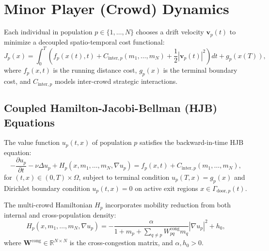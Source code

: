 \documentclass[11pt,a4paper]{article}
\begin{document}
\section{Minor Player (Crowd) Dynamics}

Each individual in population $p \in \{1, \dots, N\}$ chooses a drift velocity $\mathbf{v}_p(t)$ to minimize a decoupled spatio-temporal cost functional:
\begin{equation}
J_p(x) = \int_0^T \left( f_p(x(t), t) + C_{\text{inter}, p}(m_1, \dots, m_N) + \frac{1}{2} |\mathbf{v}_p(t)|^2 \right) dt + g_p(x(T)),
\end{equation}
where $f_p(x, t)$ is the running distance cost, $g_p(x)$ is the terminal boundary cost, and $C_{\text{inter}, p}$ models inter-crowd strategic interactions.

\subsection{Coupled Hamilton-Jacobi-Bellman (HJB) Equations}
The value function $u_p(t, x)$ of population $p$ satisfies the backward-in-time HJB equation:
\begin{equation}
\label{eq:hjb_npop}
-\frac{\partial u_p}{\partial t} - \nu \Delta u_p + H_p(x, m_1, \dots, m_N, \nabla u_p) = f_p(x, t) + C_{\text{inter}, p}(m_1, \dots, m_N),
\end{equation}
for $(t, x) \in (0, T) \times \Omega$, subject to terminal condition $u_p(T, x) = g_p(x)$ and Dirichlet boundary condition $u_p(t, x) = 0$ on active exit regions $x \in \Gamma_{\text{door}, p}(t)$.

The multi-crowd Hamiltonian $H_p$ incorporates mobility reduction from both internal and cross-population density:
\begin{equation}
H_p(x, m_1, \dots, m_N, \nabla u_p) = -\frac{\alpha}{1 + m_p + \sum_{q \neq p} W_{pq}^{\text{cong}} m_q} |\nabla u_p|^2 + h_0,
\end{equation}
where $\mathbf{W}^{\text{cong}} \in \mathbb{R}^{N \times N}$ is the cross-congestion matrix, and $\alpha, h_0 > 0$.
\end{document}
